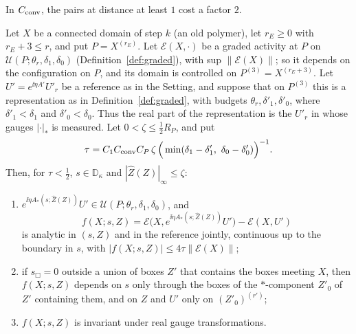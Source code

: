 In $C_{\rm conv}$, the pairs at distance at least $1$ cost a factor $2$.

\begin{proposition}\label{prop:composed}
Let $X$ be a connected domain of step $k$ (an old polymer), let $r_E\ge0$ with $r_E+3\le r$, and put $P=X^{(r_E)}$. Let $\mathcal E(X,\cdot)$ be a graded activity at $P$ on $\mathcal U(P;\theta_r,\delta_1,\delta_0)$ (Definition~\ref{def:graded}), with sup $\|\mathcal E(X)\|$; so it depends on the configuration on $P$, and its domain is controlled on $P^{(3)}=X^{(r_E+3)}$. Let $U'=e^{\ii\eta A'}U'_r$ be a reference as in the Setting, and suppose that on $P^{(3)}$ this is a representation as in Definition~\ref{def:graded}, with budgets $\theta_r,\delta'_1,\delta'_0$, where $\delta'_1<\delta_1$ and $\delta'_0<\delta_0$. Thus the real part of the representation is the $U'_r$ in whose gauges $|\cdot|_*$ is measured. Let $0<\zeta\le\frac12R_P$, and put
\[
\tau=C_1C_{\rm conv}C_P\,\zeta\,\Big(\min(\delta_1-\delta'_1,\ \delta_0-\delta'_0)\Big)^{-1}.
\]
Then, for $\tau<\frac12$, $s\in\mathbb D_\kappa$ and $|\hat Z(Z)|_\infty\le\zeta$:
\begin{enumerate}[label=(\alph*)]
\item $e^{\ii\eta A_*(s;\hat Z(Z))}U'\in\mathcal U(P;\theta_r,\delta_1,\delta_0)$, and
\[
f(X;s,Z)=\mathcal E\big(X,e^{\ii\eta A_*(s;\hat Z(Z))}U'\big)-\mathcal E(X,U')
\]
is analytic in $(s,Z)$ and in the reference jointly, continuous up to the boundary in $s$, with $|f(X;s,Z)|\le4\tau\|\mathcal E(X)\|$;
\item if $s_\Box=0$ outside a union of boxes $Z'$ that contains the boxes meeting $X$, then $f(X;s,Z)$ depends on $s$ only through the boxes of the $*$-component $Z'_0$ of $Z'$ containing them, and on $Z$ and $U'$ only on $(Z'_0)^{(r')}$;
\item $f(X;s,Z)$ is invariant under real gauge transformations.
\end{enumerate}
\end{proposition}

